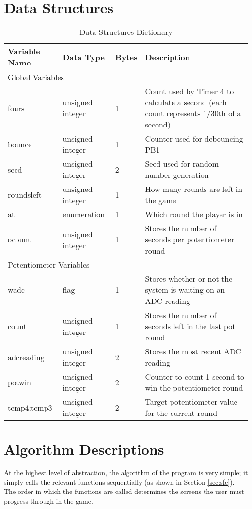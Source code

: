 \documentclass[a4paper]{article}
\begin{document}
\section{Data Structures}
\begin{table}[H]
\centering
\caption{Data Structures Dictionary}
\label{tbl:dict}
\begin{tabular}{@{}lllp{9cm}@{}}
\toprule
Variable Name & Data Type        & Bytes & Description \\ \midrule
\multicolumn{4}{l}{Global Variables} \\ \midrule
fours         & unsigned integer & 1     & Count used by Timer 4 to calculate a second (each count represents 1/30th of a second) \\
bounce        & unsigned integer & 1     & Counter used for debouncing PB1 \\
seed          & unsigned integer & 2     & Seed used for random number generation \\
roundsleft    & unsigned integer & 1     & How many rounds are left in the game \\
at            & enumeration      & 1     & Which round the player is in \\
ocount        & unsigned integer & 1     & Stores the number of seconds per potentiometer round \\ \midrule
\multicolumn{4}{l}{Potentiometer Variables} \\ \midrule
wadc          & flag             & 1     & Stores whether or not the system is waiting on an ADC reading \\
count         & unsigned integer & 1     & Stores the number of seconds left in the last pot round \\
adcreading	 & unsigned integer & 2     & Stores the most recent ADC reading \\  
potwin	& unsigned integer	& 2		& Counter to count 1 second to win the potentiometer round \\ 
temp4:temp3	& unsigned integer	& 2	& Target potentiometer value for the current round \\

\bottomrule
\end{tabular}
\end{table}

\section{Algorithm Descriptions}
At the highest level of abstraction, the algorithm of the program is very simple; it simply calls the relevant functions 
sequentially (as shown in Section \ref{sec:sfc}).
The order in which the functions are called determines the screens the user must progress through in the game.
\end{document}

